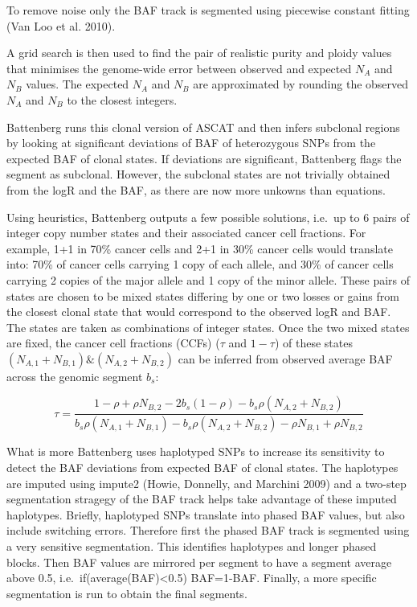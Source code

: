 \documentclass[]{article}
\begin{document}
To remove noise only the BAF track is segmented using piecewise constant
fitting (Van Loo et al. 2010).

A grid search is then used to find the pair of realistic purity and
ploidy values that minimises the genome-wide error between observed and
expected \(N_A\) and \(N_B\) values. The expected \(N_A\) and \(N_B\)
are approximated by rounding the observed \(N_A\) and \(N_B\) to the
closest integers.

Battenberg runs this clonal version of ASCAT and then infers subclonal
regions by looking at significant deviations of BAF of heterozygous SNPs
from the expected BAF of clonal states. If deviations are significant,
Battenberg flags the segment as subclonal. However, the subclonal states
are not trivially obtained from the logR and the BAF, as there are now
more unkowns than equations.

Using heuristics, Battenberg outputs a few possible solutions, i.e.~up
to 6 pairs of integer copy number states and their associated cancer
cell fractions. For example, 1+1 in 70\% cancer cells and 2+1 in 30\%
cancer cells would translate into: 70\% of cancer cells carrying 1 copy
of each allele, and 30\% of cancer cells carrying 2 copies of the major
allele and 1 copy of the minor allele. These pairs of states are chosen
to be mixed states differing by one or two losses or gains from the
closest clonal state that would correspond to the observed logR and BAF.
The states are taken as combinations of integer states. Once the two
mixed states are fixed, the cancer cell fractions (CCFs) (\(\tau\) and
\(1-\tau\)) of these states \((N_{A,1}+N_{B,1}) \& (N_{A,2}+N_{B,2})\)
can be inferred from observed average BAF across the genomic segment
\(b_s\):

\[ \tau=\frac{1-\rho+\rho
  N_{B,2}-2b_s(1-\rho)-b_s\rho(N_{A,2}+N_{B,2})}{b_s\rho(N_{A,1}+N_{B,1})-b_s\rho(N_{A,2}+N_{B,2})-\rho
  N_{B,1}+\rho N_{B,2}}\]

What is more Battenberg uses haplotyped SNPs to increase its sensitivity
to detect the BAF deviations from expected BAF of clonal states. The
haplotypes are imputed using impute2 (Howie, Donnelly, and Marchini
2009) and a two-step segmentation stragegy of the BAF track helps take
advantage of these imputed haplotypes. Briefly, haplotyped SNPs
translate into phased BAF values, but also include switching errors.
Therefore first the phased BAF track is segmented using a very sensitive
segmentation. This identifies haplotypes and longer phased blocks. Then
BAF values are mirrored per segment to have a segment average above 0.5,
i.e.~if(average(BAF)\textless{}0.5) BAF=1-BAF. Finally, a more specific
segmentation is run to obtain the final segments.
\end{document}
